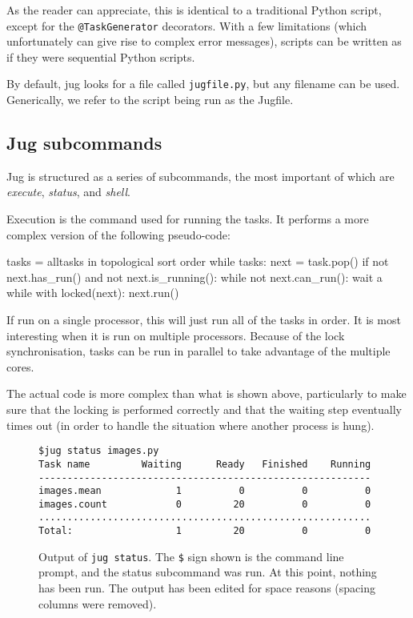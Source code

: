 \documentclass{article}
\let\code\texttt
\begin{document}
As the reader can appreciate, this is identical to a traditional Python script,
except for the \code{@TaskGenerator} decorators. With a few limitations (which
unfortunately can give rise to complex error messages), scripts can be written
as if they were sequential Python scripts.

By default, jug looks for a file called \code{jugfile.py}, but any filename can
be used. Generically, we refer to the script being run as the Jugfile.

\subsection{Jug subcommands}

Jug is structured as a series of subcommands, the most important of which are
\emph{execute}, \emph{status}, and \emph{shell}.

Execution is the command used for running the tasks. It performs a more complex
version of the following pseudo-code:

\begin{python}
tasks = alltasks in topological sort order
while tasks:
    next = task.pop()
    if not next.has_run() and not next.is_running():
        while not next.can_run():
            wait a while
        with locked(next):
            next.run()
\end{python}

If run on a single processor, this will just run all of the tasks in order. It
is most interesting when it is run on multiple processors. Because of the lock
synchronisation, tasks can be run in parallel to take advantage of the multiple
cores.

The actual code is more complex than what is shown above, particularly to make
sure that the locking is performed correctly and that the waiting step
eventually times out (in order to handle the situation where another process is
hung).

\begin{figure}
\begin{verbatim}
$jug status images.py
Task name         Waiting      Ready   Finished    Running
----------------------------------------------------------
images.mean             1          0          0          0
images.count            0         20          0          0
..........................................................
Total:                  1         20          0          0
\end{verbatim}
\caption{Output of \code{jug status}. The \texttt{\$} sign shown is the command
line prompt, and the status subcommand was run. At this point, nothing has been
run. The output has been edited for space reasons (spacing columns were
removed).}
\label{fig:jug-status-output}
\end{figure}
\end{document}

